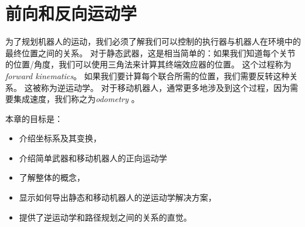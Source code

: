 \chapter{前向和反向运动学}\label{chap:kinematics}


为了规划机器人的运动，我们必须了解我们可以控制的执行器与机器人在环境中的最终位置之间的关系。 对于静态武器，这是相当简单的：如果我们知道每个关节的位置/角度，我们可以使用三角法来计算其终端效应器的位置。 这个过程称为\emph {forward kinematics}。 如果我们要计算每个联合所需的位置，我们需要反转这种关系。 这被称为逆运动学。 对于移动机器人，通常更多地涉及到这个过程，因为需要集成速度，我们称之为\emph {odometry} 。

本章的目标是：


\begin{itemize}
\item 介绍坐标系及其变换，
\item 介绍简单武器和移动机器人的正向运动学
\item 了解整体的概念，
\item 显示如何导出静态和移动机器人的逆运动学解决方案，
\item 提供了逆运动学和路径规划之间的关系的直觉。
\end{itemize}

